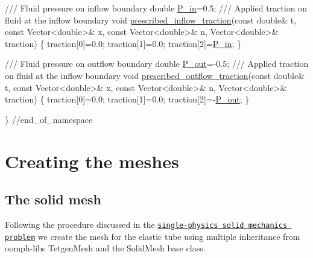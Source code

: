 \begin{DoxyCodeInclude}
 \textcolor{comment}{}
\textcolor{comment}{ /// Fluid pressure on inflow boundary}
\textcolor{comment}{} \textcolor{keywordtype}{double} \hyperlink{namespaceGlobal__Parameters_a05b26d00935600b5e0149872844f224c}{P\_in}=0.5;
\textcolor{comment}{}
\textcolor{comment}{ /// Applied traction on fluid at the inflow boundary}
\textcolor{comment}{} \textcolor{keywordtype}{void} \hyperlink{namespaceGlobal__Parameters_af7faf65214ed9ead637f7c208addb095}{prescribed\_inflow\_traction}(\textcolor{keyword}{const} \textcolor{keywordtype}{double}& t,
                                 \textcolor{keyword}{const} Vector<double>& x,
                                 \textcolor{keyword}{const} Vector<double>& n,
                                 Vector<double>& traction)
 \{
  traction[0]=0.0;
  traction[1]=0.0;
  traction[2]=\hyperlink{namespaceGlobal__Parameters_a05b26d00935600b5e0149872844f224c}{P\_in};
 \} 

\textcolor{comment}{}
\textcolor{comment}{ /// Fluid pressure on outflow boundary}
\textcolor{comment}{} \textcolor{keywordtype}{double} \hyperlink{namespaceGlobal__Parameters_ac680ed856897793d54c9c867da19169c}{P\_out}=-0.5; 
\textcolor{comment}{}
\textcolor{comment}{ /// Applied traction on fluid at the inflow boundary}
\textcolor{comment}{} \textcolor{keywordtype}{void} \hyperlink{namespaceGlobal__Parameters_a83155358b144cff7e29ecb6b209a2d3e}{prescribed\_outflow\_traction}(\textcolor{keyword}{const} \textcolor{keywordtype}{double}& t,
                                  \textcolor{keyword}{const} Vector<double>& x,
                                  \textcolor{keyword}{const} Vector<double>& n,
                                  Vector<double>& traction)
 \{
  traction[0]=0.0;
  traction[1]=0.0;
  traction[2]=-\hyperlink{namespaceGlobal__Parameters_ac680ed856897793d54c9c867da19169c}{P\_out};
 \} 

 
\} \textcolor{comment}{//end\_of\_namespace}

\end{DoxyCodeInclude}




 

\hypertarget{index_mesh_code}{}\section{Creating the meshes}\label{index_mesh_code}
\hypertarget{index_solid_mesh}{}\subsection{The solid mesh}\label{index_solid_mesh}
Following the procedure discussed in the \href{../../../solid/unstructured_three_d_solid/html/index.html}{\tt single-\/physics solid mechanics problem} we create the mesh for the elastic tube using multiple inheritance from {\ttfamily oomph-\/lib\textquotesingle{}s} {\ttfamily Tetgen\+Mesh} and the {\ttfamily Solid\+Mesh} base class.

